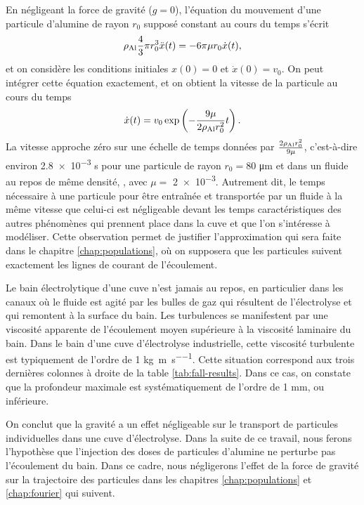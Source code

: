 \begin{remarque}
  En négligeant la force de gravité ($g = 0$), l'équation du mouvement
  d'une particule d'alumine de rayon $r_0$ supposé constant au cours
  du temps s'écrit
  \begin{equation*}
    \rho_\mathrm{Al} \frac{4}{3}\pi r_0^3 \ddot x(t) = -
    6\pi\mu r_0 \dot x(t),
  \end{equation*}
  et on considère les conditions initiales $x(0) = 0$ et $\dot x(0) =
  v_0$. On peut intégrer cette équation exactement, et on obtient la
  vitesse de la particule au cours du temps
  \begin{equation*}
    \dot x(t) = v_0\exp\left( -\frac{9\mu}{2\rho_\mathrm{Al} r_0^2}t \right).
  \end{equation*}
  La vitesse approche zéro sur une échelle de temps données par
  $\frac{2\rho_\mathrm{Al} r_0^2}{9\mu}$,
  c'est-à-dire environ \num{2.8e-3} \si{\second} pour une particule de
  rayon $r_0 = \num{80}$ \si{\micro\meter} et dans un fluide au repos
  de même densité, \ie, avec $\mu = $ \num{2e-3}. Autrement dit, le
  temps nécessaire à une particule pour être entraînée et transportée
  par un fluide à la même vitesse que celui-ci est négligeable devant
  les temps caractéristiques des autres phénomènes qui prennent place
  dans la cuve et que l'on s'intéresse à modéliser. Cette observation
  permet de justifier l'approximation qui sera faite dans le chapitre
  \ref{chap:populations}, où on supposera que les particules suivent
  exactement les lignes de courant de l'écoulement.
\end{remarque}

\begin{remarque}

  Le bain électrolytique d'une cuve n'est jamais au repos, en
  particulier dans les canaux où le fluide est agité par les bulles de
  gaz qui résultent de l'électrolyse et qui remontent à la surface du
  bain. Les turbulences se manifestent par une viscosité apparente de
  l'écoulement moyen supérieure à la viscosité laminaire du bain. Dans
  le bain d'une cuve d'électrolyse industrielle, cette viscosité
  turbulente est typiquement de l'ordre de \num{1}
  \si{\kilo\gram\per\meter\per\second}. Cette situation correspond aux
  trois dernières colonnes à droite de la table
  \ref{tab:fall-results}. Dans ce cas, on constate que la profondeur
  maximale est systématiquement de l'ordre de
  \num{1} \si{\milli\meter}, ou inférieure.

  On conclut que la gravité a un effet négligeable sur le transport de
  particules individuelles dans une cuve d'électrolyse. Dans la suite
  de ce travail, nous ferons l'hypothèse que l'injection des doses de
  particules d'alumine ne perturbe pas l'écoulement du bain. Dans ce
  cadre, nous négligerons l'effet de la force de gravité sur la
  trajectoire des particules dans les chapitres \ref{chap:populations}
  et \ref{chap:fourier} qui suivent.
\end{remarque}
